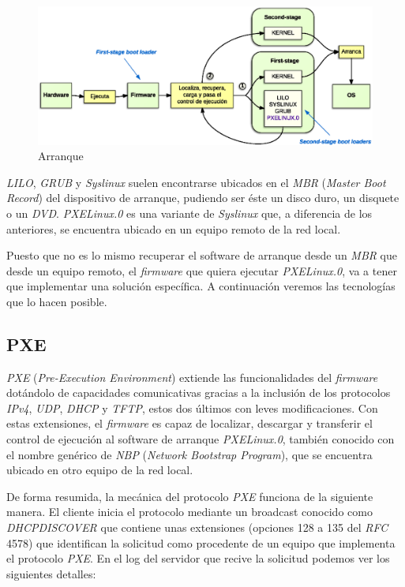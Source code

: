 \documentclass[a4paper,12pt,spanish,final]{epsc_tfc_pfc}
\begin{document}
\begin{figure}[h]
  \centering
    \includegraphics[scale=0.9]{arranque}
      \caption{Arranque}
\end{figure}

\emph{LILO}, \emph{GRUB} y \emph{Syslinux} suelen encontrarse ubicados en el \emph{MBR} (\emph{Master Boot Record}) del dispositivo de arranque, pudiendo ser éste un disco duro, un disquete o un \emph{DVD}. \emph{PXELinux.0} es una variante de \emph{Syslinux} que, a diferencia de los anteriores, se encuentra ubicado en un equipo remoto de la red local.

Puesto que no es lo mismo recuperar el software de arranque desde un \emph{MBR} que desde un equipo remoto, el \emph{firmware} que quiera ejecutar \emph{PXELinux.0}, va a tener que implementar una solución específica. A continuación veremos las tecnologías que lo hacen posible.

\subsection{PXE}
\emph{PXE} (\emph{Pre-Execution Environment}) extiende las funcionalidades del \emph{firmware} dotándolo de capacidades comunicativas gracias a la inclusión de los protocolos \emph{IPv4}, \emph{UDP}, \emph{DHCP} y \emph{TFTP}, estos dos últimos con leves modificaciones. Con estas extensiones, el \emph{firmware} es capaz de localizar, descargar y transferir el control de ejecución al software de arranque \emph{PXELinux.0}, también conocido con el nombre genérico de \emph{NBP} (\emph{Network Bootstrap Program}), que se encuentra ubicado en otro equipo de la red local.

De forma resumida, la mecánica del protocolo \emph{PXE} funciona de la siguiente manera. El cliente inicia el protocolo mediante un broadcast conocido como \emph{DHCPDISCOVER} que contiene unas extensiones (opciones 128 a 135 del \emph{RFC} 4578) que identifican la solicitud como procedente de un equipo que implementa el protocolo \emph{PXE}. En el log del servidor que recive la solicitud podemos ver los siguientes detalles:\\
\end{document}
